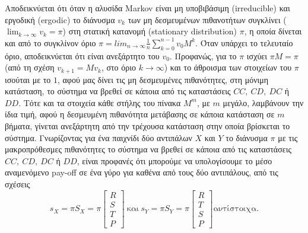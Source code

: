 \documentclass{article}
\begin{document}
Αποδεικνύεται ότι όταν η αλυσίδα Markov είναι μη υποβιβάσιμη (irreducible) και εργοδική (ergodic) το διάνυσμα $v_k$ των μη δεσμευμένων πιθανοτήτων συγκλίνει ($\lim_{k\to\infty}v_k=\pi$) στη στατική κατανομή (stationary distribution) $\pi$, η οποία δίνεται και από το συγκλίνον όριο $\pi=lim_{n\to\infty}\frac{1}{n}\sum_{k=0}^{n-1}v_0M^k$. Όταν υπάρχει το τελευταίο όριο, αποδεικνύεται ότι είναι ανεξάρτητο του $v_0$. Προφανώς, για το $\pi$ ισχύει $\pi M=\pi$ (από τη σχέση $v_{k+1}=Mv_k$, στο όριο $k\to\infty$) και το άθροισμα των στοιχείων του $\pi$ ισούται με το $1$, αφού μας δίνει τις μη δεσμευμένες πιθανότητες, στη μόνιμη κατάσταση, το σύστημα να βρεθεί σε κάποια από τις καταστάσεις $CC,\ CD,\ DC$ ή $DD$. Τότε και τα στοιχεία κάθε στήλης του πίνακα $M^m$, με $m$ μεγάλο, λαμβάνουν την ίδια τιμή, αφού η δεσμευμένη πιθανότητα μετάβασης σε κάποια κατάσταση σε $m$ βήματα, γίνεται ανεξάρτητη από την τρέχουσα κατάσταση στην οποία βρίσκεται το σύστημα. Γνωρίζοντας για ένα παιχνίδι δύο αντιπάλων $X$ και $Y$ το διάνυσμα $\pi$ με τις μακροπρόθεσμες πιθανότητες το σύστημα να βρεθεί σε κάποια από τις καταστάσεις $CC,\ CD,\ DC$ ή $DD$, είναι προφανές ότι μπορούμε να υπολογίσουμε το μέσο αναμενόμενο pay-off σε ένα γύρο για καθένα από τους δύο αντιπάλους, από τις σχέσεις 
\\
$$s_X=\pi S_X=\pi
\begin{bmatrix}
R \\
S \\
T \\
P 
\end{bmatrix}\  
\text{και}\ 
s_Y=\pi S_Y=\pi
 \begin{bmatrix}
R \\
T \\
S \\
P 
\end{bmatrix}
\text{αντίστοιχα.}
$$
\end{document}
